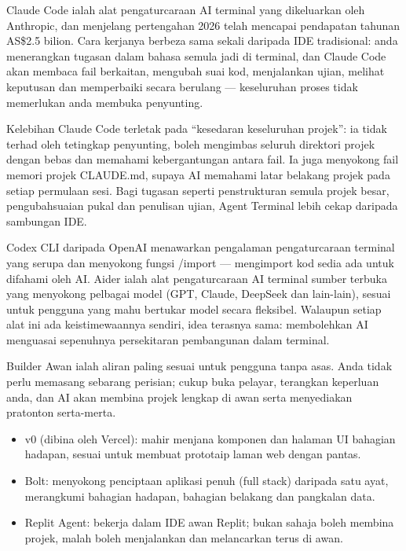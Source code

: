 
Claude Code ialah alat pengaturcaraan AI terminal yang dikeluarkan oleh Anthropic, dan menjelang pertengahan 2026 telah mencapai pendapatan tahunan AS\$2.5 bilion. Cara kerjanya berbeza sama sekali daripada IDE tradisional: anda menerangkan tugasan dalam bahasa semula jadi di terminal, dan Claude Code akan membaca fail berkaitan, mengubah suai kod, menjalankan ujian, melihat keputusan dan memperbaiki secara berulang — keseluruhan proses tidak memerlukan anda membuka penyunting.

Kelebihan Claude Code terletak pada “kesedaran keseluruhan projek”: ia tidak terhad oleh tetingkap penyunting, boleh mengimbas seluruh direktori projek dengan bebas dan memahami kebergantungan antara fail. Ia juga menyokong fail memori projek CLAUDE.md, supaya AI memahami latar belakang projek pada setiap permulaan sesi. Bagi tugasan seperti penstrukturan semula projek besar, pengubahsuaian pukal dan penulisan ujian, Agent Terminal lebih cekap daripada sambungan IDE.


Codex CLI daripada OpenAI menawarkan pengalaman pengaturcaraan terminal yang serupa dan menyokong fungsi /import — mengimport kod sedia ada untuk difahami oleh AI. Aider ialah alat pengaturcaraan AI terminal sumber terbuka yang menyokong pelbagai model (GPT, Claude, DeepSeek dan lain-lain), sesuai untuk pengguna yang mahu bertukar model secara fleksibel. Walaupun setiap alat ini ada keistimewaannya sendiri, idea terasnya sama: membolehkan AI menguasai sepenuhnya persekitaran pembangunan dalam terminal.


Builder Awan ialah aliran paling sesuai untuk pengguna tanpa asas. Anda tidak perlu memasang sebarang perisian; cukup buka pelayar, terangkan keperluan anda, dan AI akan membina projek lengkap di awan serta menyediakan pratonton serta-merta.

\begin{itemize}
  \item v0 (dibina oleh Vercel): mahir menjana komponen dan halaman UI bahagian hadapan, sesuai untuk membuat prototaip laman web dengan pantas.
  \item Bolt: menyokong penciptaan aplikasi penuh (full stack) daripada satu ayat, merangkumi bahagian hadapan, bahagian belakang dan pangkalan data.
  \item Replit Agent: bekerja dalam IDE awan Replit; bukan sahaja boleh membina projek, malah boleh menjalankan dan melancarkan terus di awan.
\end{itemize}

